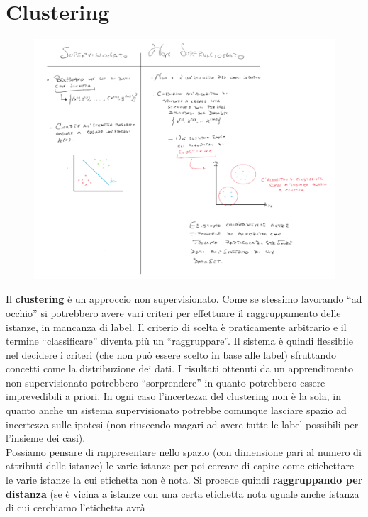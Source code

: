 \chapter{Clustering}
\begin{figure}[H]
    \centering
    \includegraphics[width=1\textwidth]{img/LearningNonSupervisionato.png}
\end{figure}
Il \textbf{clustering} è un approccio non supervisionato. Come se stessimo
lavorando ``ad occhio'' si potrebbero avere vari criteri per effettuare il
raggruppamento delle istanze, in mancanza di label. Il criterio di scelta è
praticamente arbitrario e il termine ``classificare'' diventa più un
``raggruppare''. Il sistema è quindi flessibile nel decidere i criteri (che non
può essere scelto in base alle label) sfruttando concetti come la distribuzione
dei dati. I risultati ottenuti da un apprendimento
non supervisionato potrebbero ``sorprendere'' in quanto potrebbero essere
imprevedibili a priori. In ogni caso l'incertezza del clustering non è la sola,
in quanto anche un sistema supervisionato potrebbe comunque lasciare spazio ad
incertezza sulle ipotesi (non riuscendo magari ad avere tutte le label possibili
per l'insieme dei casi).\\ 
Possiamo pensare di rappresentare nello spazio (con dimensione pari al numero di
attributi delle istanze) le varie istanze per poi cercare di capire come
etichettare le varie istanze la cui etichetta non è nota. Si procede quindi
\textbf{raggruppando per distanza} (se è vicina a istanze con una certa
etichetta nota uguale anche istanza di cui cerchiamo l'etichetta avrà
